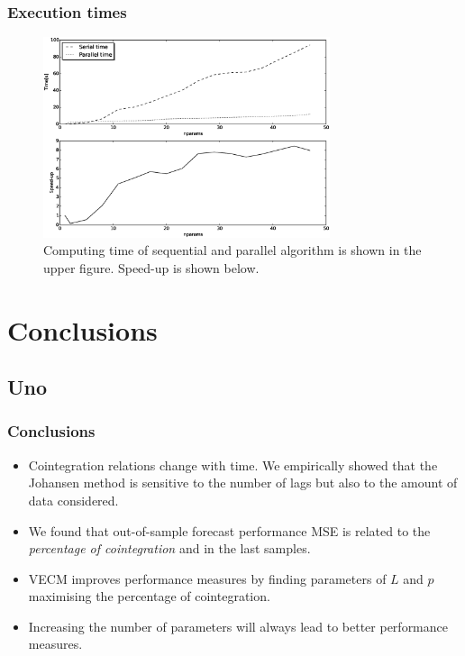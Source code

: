 \documentclass[compress,red]{beamer}
\begin{document}
\begin{frame}
\frametitle{Execution times}
\begin{figure}[ht]
  \centering
  \includegraphics[width=0.75\textwidth]{img/extimes}
  \caption{Computing time of sequential and parallel algorithm is shown in the
  upper figure. Speed-up is shown below.}
  \label{fig:extimes}
\end{figure}

\end{frame}

\section{Conclusions}
\subsection{Uno}
\begin{frame}
\frametitle{Conclusions}
\begin{itemize}
\item Cointegration relations change with time. We empirically showed that the Johansen method is sensitive to the number of lags but also to the amount of data considered.
\item We found that out-of-sample forecast performance MSE is related to the {\em percentage of cointegration\/} and in the last samples.  
\item VECM improves performance measures by finding
parameters of $L$ and $p$ maximising the percentage of cointegration.
\item Increasing the number of parameters will always lead to
better performance measures.
\end{itemize}
\end{frame}
\end{document}
